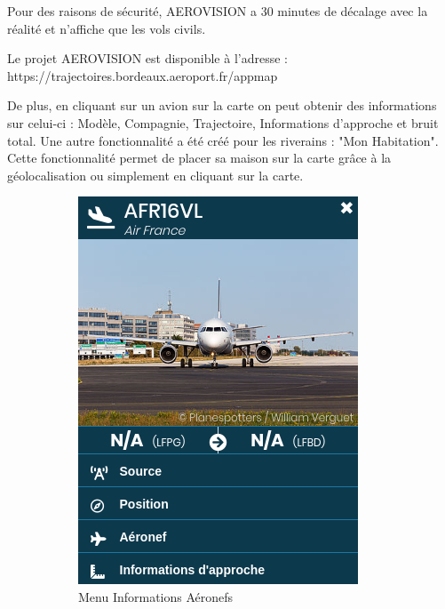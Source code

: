 Pour des raisons de sécurité, AEROVISION a 30 minutes de décalage avec la réalité et n'affiche que les vols civils.

Le projet AEROVISION est disponible à l'adresse : https://trajectoires.bordeaux.aeroport.fr/appmap\newline

De plus, en cliquant sur un avion sur la carte on peut obtenir des informations sur celui-ci : Modèle, Compagnie, Trajectoire, Informations d'approche et bruit total.
Une autre fonctionnalité a été créé pour les riverains : "Mon Habitation". Cette fonctionnalité permet de placer sa maison sur la carte grâce à la géolocalisation ou simplement en cliquant sur la carte.

\begin{figure}[hbt!]
  \begin{subfigure}{0.5\textwidth}
    \centering
    \includegraphics[width=.7\linewidth]{Images/aerovisioninfo.png}  
    \caption{Menu Informations Aéronefs}
    \label{fig:aerovisioninfo}
  \end{subfigure}
  \begin{subfigure}{0.5\textwidth}
    \centering

\end{subfigure}
\end{figure}
